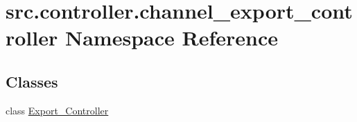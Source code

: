 \hypertarget{namespacesrc_1_1controller_1_1channel__export__controller}{}\section{src.\+controller.\+channel\+\_\+export\+\_\+controller Namespace Reference}
\label{namespacesrc_1_1controller_1_1channel__export__controller}
\subsection*{Classes}
\begin{DoxyCompactItemize}
\item 
class \hyperlink{classsrc_1_1controller_1_1channel__export__controller_1_1Export__Controller}{Export\+\_\+\+Controller}
\end{DoxyCompactItemize}
